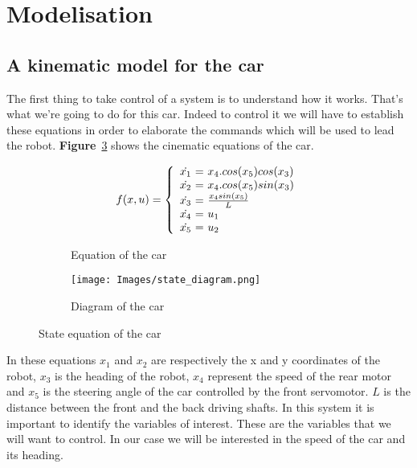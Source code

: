 \section{Modelisation}

\subsection{A kinematic model for the car}
The first thing to take control of a system is to understand how it
works. That's what we're going to do for this car. Indeed to control
it we will have to establish these equations in order to elaborate
the commands which will be used to lead the robot. \textbf{Figure}~\ref{fig:state}
shows the cinematic equations of the car.

\begin{figure}[!ht]
    \centering
    \begin{subfigure}[b]{0.45\textwidth}
        \centering
        
            $$ f(x, u) = \left \{
            \begin{array}{c @{=} l}
                \dot{x_1}\ & \ x_4.cos(x_5) cos(x_3) \\
                \dot{x_2}\ & \ x_4.cos(x_5) sin(x_3) \\
                \dot{x_3}\ & \ \frac{x_4 sin(x_5)}{L} \\
                \dot{x_4}\ & \ u_1 \\
                \dot{x_5}\ & \ u_2 
            \end{array}
            \right. $$
        
        \caption{Equation of the car}
        \label{eqn:state}
    \end{subfigure}
    \hfill
    \begin{subfigure}[b]{0.45\textwidth}
        \centering
        \texttt{[image: Images/state\_diagram.png]}
        \caption{Diagram of the car}
        \label{fig:raspi_config}
    \end{subfigure}
    \caption{State equation of the car}
    \label{fig:state}
\end{figure}



In these equations $x_1$ and $x_2$ are respectively the x and y
coordinates of the robot, $x_3$ is the heading of the robot, $x_4$
represent the speed of the rear motor and $x_5$ is the steering angle
of the car controlled by the front servomotor. $L$ is the distance between
the front and the back driving shafts. In this system it is
important to identify the variables of interest. These are the variables
that we will want to control. In our case we will be interested in the 
speed of the car and its heading. \\

